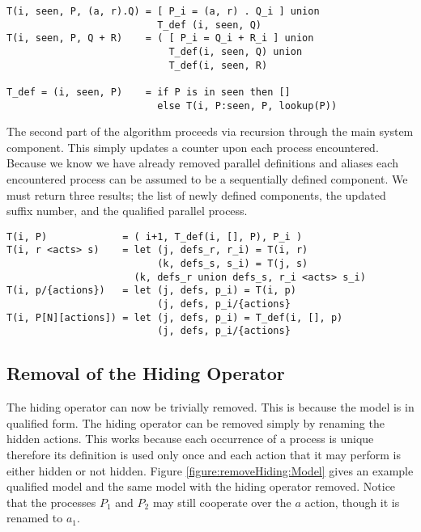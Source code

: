 \begin{verbatim}
T(i, seen, P, (a, r).Q) = [ P_i = (a, r) . Q_i ] union
                          T_def (i, seen, Q)
T(i, seen, P, Q + R)    = ( [ P_i = Q_i + R_i ] union
                            T_def(i, seen, Q) union
                            T_def(i, seen, R)

T_def = (i, seen, P)    = if P is in seen then []
                          else T(i, P:seen, P, lookup(P))
\end{verbatim}


The second part of the algorithm proceeds via recursion through the main
system component. This simply updates a counter upon each process encountered.
Because we know we have already removed parallel definitions and aliases each
encountered process can be assumed to be a sequentially defined component.
We must return three results; the list of newly defined components, the updated
suffix number, and the qualified parallel process.

\begin{verbatim}
T(i, P)             = ( i+1, T_def(i, [], P), P_i )
T(i, r <acts> s)    = let (j, defs_r, r_i) = T(i, r)
                          (k, defs_s, s_i) = T(j, s)
                      (k, defs_r union defs_s, r_i <acts> s_i)
T(i, p/{actions})   = let (j, defs, p_i) = T(i, p)
                          (j, defs, p_i/{actions}
T(i, P[N][actions]) = let (j, defs, p_i) = T_def(i, [], p)
                          (j, defs, p_i/{actions}
\end{verbatim}

\subsection{Removal of the Hiding Operator}
The hiding operator can now be trivially removed.
This is because the model is in qualified form.
The hiding operator can be removed simply by renaming the hidden actions.
This works because each occurrence of a process is unique therefore
its definition is used only once and each action that it may perform
is either hidden or not hidden.
Figure \ref{figure:removeHiding:Model}
gives an example qualified model and the same model with the hiding operator
removed. Notice that the processes $P_1$ and $P_2$ may still cooperate over
the $a$ action, though it is renamed to $a_1$.

